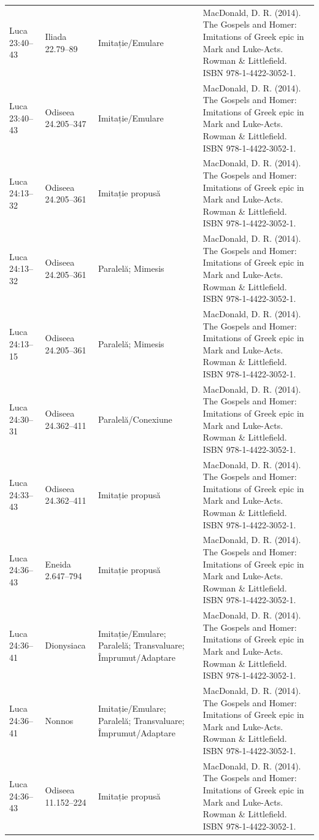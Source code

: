 \documentclass[12pt,a4paper,twoside,openany]{book}
\begin{document}
\begin{longtable}{L{1.4cm}L{1.7cm}L{3.1cm}L{8.4cm}}
Luca 23:40–43 & Iliada 22.79–89 & Imitație/Emulare & MacDonald, D. R. (2014). The Gospels and Homer: Imitations of Greek epic in Mark and Luke-Acts. Rowman \& Littlefield. ISBN 978-1-4422-3052-1. \\
Luca 23:40–43 & Odiseea 24.205–347 & Imitație/Emulare & MacDonald, D. R. (2014). The Gospels and Homer: Imitations of Greek epic in Mark and Luke-Acts. Rowman \& Littlefield. ISBN 978-1-4422-3052-1. \\
Luca 24:13–32 & Odiseea 24.205–361 & Imitație propusă & MacDonald, D. R. (2014). The Gospels and Homer: Imitations of Greek epic in Mark and Luke-Acts. Rowman \& Littlefield. ISBN 978-1-4422-3052-1. \\
Luca 24:13–32 & Odiseea 24.205–361 & Paralelă; Mimesis & MacDonald, D. R. (2014). The Gospels and Homer: Imitations of Greek epic in Mark and Luke-Acts. Rowman \& Littlefield. ISBN 978-1-4422-3052-1. \\
Luca 24:13–15 & Odiseea 24.205–361 & Paralelă; Mimesis & MacDonald, D. R. (2014). The Gospels and Homer: Imitations of Greek epic in Mark and Luke-Acts. Rowman \& Littlefield. ISBN 978-1-4422-3052-1. \\
Luca 24:30–31 & Odiseea 24.362–411 & Paralelă/Conexiune & MacDonald, D. R. (2014). The Gospels and Homer: Imitations of Greek epic in Mark and Luke-Acts. Rowman \& Littlefield. ISBN 978-1-4422-3052-1. \\
Luca 24:33–43 & Odiseea 24.362–411 & Imitație propusă & MacDonald, D. R. (2014). The Gospels and Homer: Imitations of Greek epic in Mark and Luke-Acts. Rowman \& Littlefield. ISBN 978-1-4422-3052-1. \\
Luca 24:36–43 & Eneida 2.647–794 & Imitație propusă & MacDonald, D. R. (2014). The Gospels and Homer: Imitations of Greek epic in Mark and Luke-Acts. Rowman \& Littlefield. ISBN 978-1-4422-3052-1. \\
Luca 24:36–41 & Dionysiaca & Imitație/Emulare; Paralelă; Transvaluare; Împrumut/Adaptare & MacDonald, D. R. (2014). The Gospels and Homer: Imitations of Greek epic in Mark and Luke-Acts. Rowman \& Littlefield. ISBN 978-1-4422-3052-1. \\
Luca 24:36–41 & Nonnos & Imitație/Emulare; Paralelă; Transvaluare; Împrumut/Adaptare & MacDonald, D. R. (2014). The Gospels and Homer: Imitations of Greek epic in Mark and Luke-Acts. Rowman \& Littlefield. ISBN 978-1-4422-3052-1. \\
Luca 24:36–43 & Odiseea 11.152–224 & Imitație propusă & MacDonald, D. R. (2014). The Gospels and Homer: Imitations of Greek epic in Mark and Luke-Acts. Rowman \& Littlefield. ISBN 978-1-4422-3052-1. \\

\end{longtable}
\end{document}
